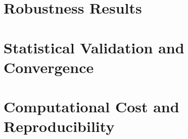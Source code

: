 \documentclass[pdflatex,sn-mathphys-num]{sn-jnl}
\begin{document}
\FloatBarrier
\clearpage
\section{Robustness Results}\label{app:robustness}
\setcounter{table}{0}



\FloatBarrier
\clearpage
\section{Statistical Validation and Convergence}\label{app:statistics}
\setcounter{table}{0}



\FloatBarrier
\clearpage
\section{Computational Cost and Reproducibility}\label{app:release}
\setcounter{table}{0}

\FloatBarrier
\clearpage

\end{document}
